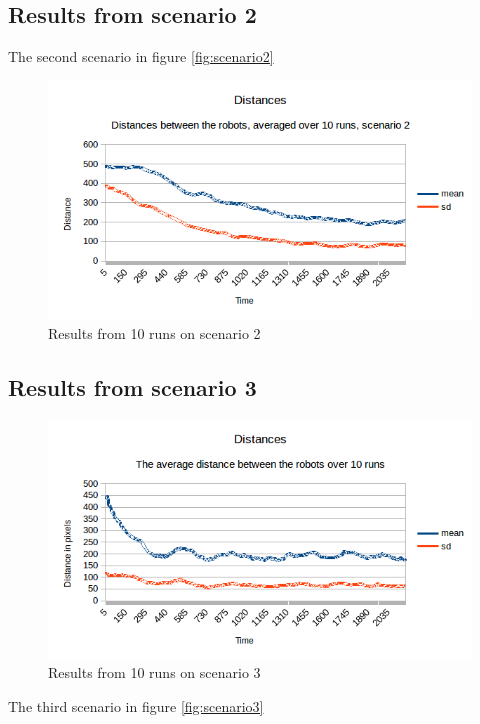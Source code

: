 \subsection{Results from scenario 2}
\label{sec:res2}
The second scenario in figure \ref{fig:scenario2}

\begin{figure}[h]
\begin{center}
\includegraphics[width=1.1\linewidth]{figs/resdistancescene2.png}
\end{center}
\caption[Results 2]{Results from 10 runs on scenario 2}
\label{fig:scene2res}
\end{figure}

\subsection{Results from scenario 3}
\label{sec:res3}
\begin{figure}[h]
\begin{center}
\includegraphics[width=1.1\linewidth]{figs/resdistancescene3.png}
\end{center}
\caption[Results 3]{Results from 10 runs on scenario 3}
\label{fig:scene3res}
\end{figure}
The third scenario in figure \ref{fig:scenario3}

